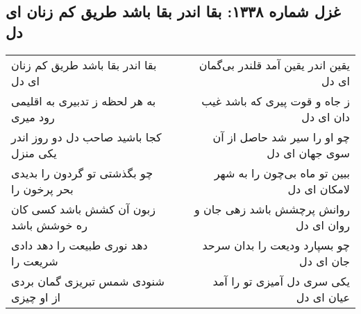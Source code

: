 \begin{center}
\section*{غزل شماره ۱۳۳۸: بقا اندر بقا باشد طریق کم زنان ای دل}
\label{sec:1338}
\begin{longtable}{l p{0.5cm} r}
بقا اندر بقا باشد طریق کم زنان ای دل
&&
یقین اندر یقین آمد قلندر بی‌گمان ای دل
\\
به هر لحظه ز تدبیری به اقلیمی رود میری
&&
ز جاه و قوت پیری که باشد غیب دان ای دل
\\
کجا باشید صاحب دل دو روز اندر یکی منزل
&&
چو او را سیر شد حاصل از آن سوی جهان ای دل
\\
چو بگذشتی تو گردون را بدیدی بحر پرخون را
&&
ببین تو ماه بی‌چون را به شهر لامکان ای دل
\\
زبون آن کشش باشد کسی کان ره خوشش باشد
&&
روانش پرچشش باشد زهی جان و روان ای دل
\\
دهد نوری طبیعت را دهد دادی شریعت را
&&
چو بسپارد ودیعت را بدان سرحد جان ای دل
\\
شنودی شمس تبریزی گمان بردی از او چیزی
&&
یکی سری دل آمیزی تو را آمد عیان ای دل
\\
\end{longtable}
\end{center}
